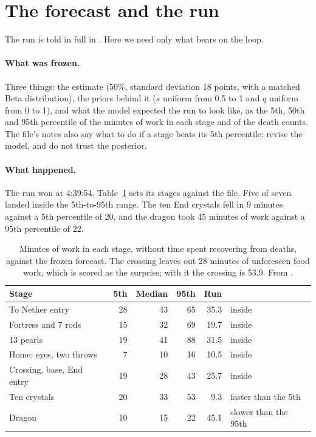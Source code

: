 \documentclass[11pt,a4paper]{article}
\begin{document}
\section{The forecast and the run}
\label{sec:forecast}

The run is told in full in \citet{batsuk2026fifth}. Here we need only what bears on the loop.

\paragraph{What was frozen.} Three things: the estimate (50\%, standard deviation 18 points, with a matched Beta distribution), the priors behind it ($s$ uniform from 0.5 to 1 and $q$ uniform from 0 to 1), and what the model expected the run to look like, as the 5th, 50th and 95th percentile of the minutes of work in each stage and of the death counts. The file's notes also say what to do if a stage beats its 5th percentile: revise the model, and do not trust the posterior.

\paragraph{What happened.} The run won at 4:39:54. Table~\ref{tab:stages} sets its stages against the file. Five of seven landed inside the 5th-to-95th range. The ten End crystals fell in 9 minutes against a 5th percentile of 20, and the dragon took 45 minutes of work against a 95th percentile of 22.

\begin{table}[!tbp]
\caption{Minutes of work in each stage, without time spent recovering from deaths, against the frozen forecast. The crossing leaves out 28 minutes of unforeseen food work, which is scored as the surprise; with it the crossing is 53.9. From \citet{batsuk2026fifth}.}
\label{tab:stages}
\small
\begin{tabularx}{\textwidth}{@{}Xrrrrl@{}}
\toprule
Stage & 5th & Median & 95th & Run & \\
\midrule
To Nether entry & 28 & 43 & 65 & 35.3 & inside \\
Fortress and 7 rods & 15 & 32 & 69 & 19.7 & inside \\
13 pearls & 19 & 41 & 88 & 31.5 & inside \\
Home: eyes, two throws & 7 & 10 & 16 & 10.5 & inside \\
Crossing, base, End entry & 19 & 28 & 43 & 25.7 & inside \\
Ten crystals & 20 & 33 & 53 & 9.3 & faster than the 5th \\
Dragon & 10 & 15 & 22 & 45.1 & slower than the 95th \\
\bottomrule
\end{tabularx}
\end{table}
\end{document}
